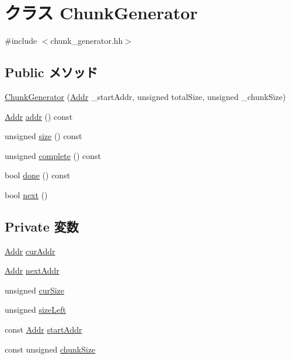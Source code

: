 \hypertarget{classChunkGenerator}{
\section{クラス ChunkGenerator}
\label{classChunkGenerator}
}


{\ttfamily \#include $<$chunk\_\-generator.hh$>$}\subsection*{Public メソッド}
\begin{DoxyCompactItemize}
\item 
\hyperlink{classChunkGenerator_a9dda668a747384202dd80c58a86c9b6a}{ChunkGenerator} (\hyperlink{base_2types_8hh_af1bb03d6a4ee096394a6749f0a169232}{Addr} \_\-startAddr, unsigned totalSize, unsigned \_\-chunkSize)
\item 
\hyperlink{base_2types_8hh_af1bb03d6a4ee096394a6749f0a169232}{Addr} \hyperlink{classChunkGenerator_a4e8648f42b38341a268850a18c86830d}{addr} () const 
\item 
unsigned \hyperlink{classChunkGenerator_acdb549c592f948a9d973d4d84b02ef87}{size} () const 
\item 
unsigned \hyperlink{classChunkGenerator_a63320000d91910d20f33799285652714}{complete} () const 
\item 
bool \hyperlink{classChunkGenerator_a6db83072bdb45ff66ab856903170c40d}{done} () const 
\item 
bool \hyperlink{classChunkGenerator_a80870c233d0237e3588a2d6f8d176916}{next} ()
\end{DoxyCompactItemize}
\subsection*{Private 変数}
\begin{DoxyCompactItemize}
\item 
\hyperlink{base_2types_8hh_af1bb03d6a4ee096394a6749f0a169232}{Addr} \hyperlink{classChunkGenerator_a791de8c75b67169bea9c7e9b56a294f7}{curAddr}
\item 
\hyperlink{base_2types_8hh_af1bb03d6a4ee096394a6749f0a169232}{Addr} \hyperlink{classChunkGenerator_a76968ef2ad8d208fe33cfb493986e85a}{nextAddr}
\item 
unsigned \hyperlink{classChunkGenerator_a33d0ca999186c72380a50c5e4b6e9880}{curSize}
\item 
unsigned \hyperlink{classChunkGenerator_ae4c879109cc558f8eb48b4f92662d550}{sizeLeft}
\item 
const \hyperlink{base_2types_8hh_af1bb03d6a4ee096394a6749f0a169232}{Addr} \hyperlink{classChunkGenerator_a6aeb968ddd05c079215ef147ed22708a}{startAddr}
\item 
const unsigned \hyperlink{classChunkGenerator_ac263b0783f6a47755de4c13fcd212c87}{chunkSize}
\end{DoxyCompactItemize}



